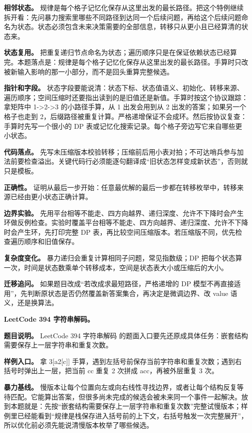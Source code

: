 \textbf{相邻状态。} 规律是每个格子记忆化保存从这里出发的最长路径。把这个特例继续拆开看：先问暴力搜索里哪些不同路径到达同一个后续问题，再给这个后续问题命名为状态。状态必须包含未来决策需要的全部信息，转移只从更小且已经算清的状态来。

\textbf{状态复用。} 把重复递归节点命名为状态；遍历顺序只是在保证依赖状态已经算完。本题落点是：规律是每个格子记忆化保存从这里出发的最长路径。手算时只改被新输入影响的那一小部分，而不是回头重算完整候选。

\textbf{指针和字段。} 状态字段要能说清：状态下标、状态值语义、初始化、转移来源、遍历顺序；空间压缩时还要指出读到的是旧值还是新值。手算时按这个协议跟踪：拿矩阵中 1->2->3 的小路径手算，从 1 出发会用到从 2 出发的答案；如果另一个格子也走到 2，后缀路径被重复计算。严格递增保证不会成环。然后按协议复查：手算时先写一个很小的 DP 表或记忆化搜索记录。每个格子旁边写它来自哪些更小状态。

\textbf{代码落点。} 先写未压缩版本校验转移；压缩前后用小表对拍；不可达哨兵参与加法前要检查溢出。关键代码行必须能逐句翻译成“旧状态怎样变成新状态”，否则就只是模板。

\textbf{正确性。} 证明从最后一步开始：任意最优解的最后一步都在转移枚举中，转移来源已经由更小状态正确计算。

\textbf{边界实验。} 先用平台相等不能走、四方向越界、递归深度、允许不下降时会产生环做反例检查。实验时覆盖平台相等不能走、四方向越界、递归深度、允许不下降时会产生环，先打印完整 DP 表，再比较空间压缩版本。若压缩版不同，优先检查遍历顺序和旧值保存。

\textbf{复杂度变化。} 暴力递归会重复计算相同子问题，常见指数级；DP 把每个状态算一次，时间是状态数乘单个转移成本，空间是状态表大小或压缩后的大小。

\textbf{迁移追问。} 如果题目改成“若改成求最短路径，严格递增的 DP 模型不再直接适用”，先判断原状态是否仍然覆盖新答案集合，再决定是微调边界、改 value 语义，还是换算法。

\noindent\textbf{LeetCode 394 字符串解码。}

\textbf{题目说明。} LeetCode 394 字符串解码 的题面入口要先还原成具体任务：嵌套结构需要保存上一层字符串和重复次数。

\textbf{样例入口。} 拿 3[a2[c]] 手算，遇到左括号前保存当前字符串和重复次数；遇到右括号时弹出上一层，把当前 cc 重复 2 次拼成 acc，再被外层重复 3 次。

\textbf{暴力基线。} 慢版本让每个位置向左或向右线性寻找边界，或者让每个结构反复等待匹配。它能算出答案，但很多尚未完成的候选会被未来同一个事件一起解决。放到本题就是：先按“嵌套结构需要保存上一层字符串和重复次数”完整试慢版本；样例里已经能看到“规律是栈保存进入括号前的上下文，右括号触发一次完整展开”，所以优化前必须先能说清慢版本枚举了哪些候选。

